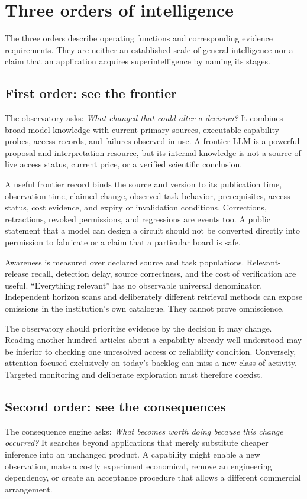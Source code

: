 \documentclass[11pt,letterpaper]{article}
\theoremstyle{remark}\newtheorem{remark}{Remark}[section]
\begin{document}
\section{Three orders of intelligence}\label{sec:orders}
The three orders describe operating functions and corresponding evidence requirements. They are neither an established scale of general intelligence nor a claim that an application acquires superintelligence by naming its stages.

\subsection{First order: see the frontier}
The observatory asks: \emph{What changed that could alter a decision?} It combines broad model knowledge with current primary sources, executable capability probes, access records, and failures observed in use. A frontier LLM is a powerful proposal and interpretation resource, but its internal knowledge is not a source of live access status, current price, or a verified scientific conclusion.

A useful frontier record binds the source and version to its publication time, observation time, claimed change, observed task behavior, prerequisites, access status, cost evidence, and expiry or invalidation conditions. Corrections, retractions, revoked permissions, and regressions are events too. A public statement that a model can design a circuit should not be converted directly into permission to fabricate or a claim that a particular board is safe.

Awareness is measured over declared source and task populations. Relevant-release recall, detection delay, source correctness, and the cost of verification are useful. ``Everything relevant'' has no observable universal denominator. Independent horizon scans and deliberately different retrieval methods can expose omissions in the institution's own catalogue. They cannot prove omniscience.

The observatory should prioritize evidence by the decision it may change. Reading another hundred articles about a capability already well understood may be inferior to checking one unresolved access or reliability condition. Conversely, attention focused exclusively on today's backlog can miss a new class of activity. Targeted monitoring and deliberate exploration must therefore coexist.

\subsection{Second order: see the consequences}
The consequence engine asks: \emph{What becomes worth doing because this change occurred?} It searches beyond applications that merely substitute cheaper inference into an unchanged product. A capability might enable a new observation, make a costly experiment economical, remove an engineering dependency, or create an acceptance procedure that allows a different commercial arrangement.
\end{document}

